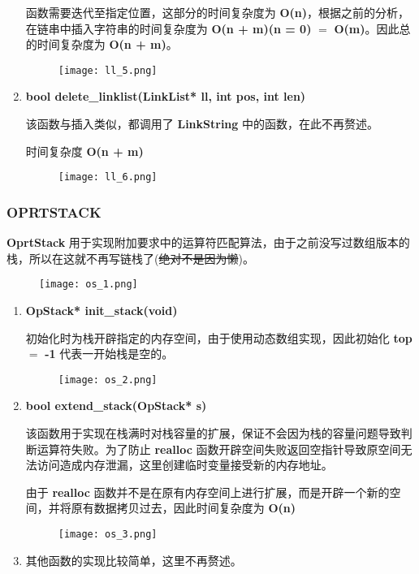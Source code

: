 \begin{enumerate}
                    \par 函数需要迭代至指定位置，这部分的时间复杂度为 \textbf{O(n)}，根据之前的分析，在链串中插入字符串的时间复杂度为 \textbf{O(n + m)(n = 0)} $=$ \textbf{O(m)}。因此总的时间复杂度为 \textbf{O(n + m)}。
                    \begin{figure*}[htbp]
                        \texttt{[image: ll\_5.png]}
                    \end{figure*}
                \newpage
                \item \textbf{bool delete\_linklist(LinkList* ll, int pos, int len)}
                    \par 该函数与插入类似，都调用了 \textbf{LinkString} 中的函数，在此不再赘述。
                    \par 时间复杂度 \textbf{O(n + m)}
                    \begin{figure*}[htbp]
                        \texttt{[image: ll\_6.png]}
                    \end{figure*}
            \end{enumerate}
       \subsubsection{OPRTSTACK}
            \par \textbf{OprtStack} 用于实现附加要求中的运算符匹配算法，由于之前没写过数组版本的栈，所以在这就不再写链栈了(\sout{绝对不是因为懒})。
            \begin{figure*}[htbp]
                \texttt{[image: os\_1.png]}
            \end{figure*}
            \begin{enumerate}
                \item \textbf{OpStack* init\_stack(void)}
                    \par 初始化时为栈开辟指定的内存空间，由于使用动态数组实现，因此初始化 \textbf{top} $=$ \textbf{-1} 代表一开始栈是空的。
                    \begin{figure*}[htbp]
                        \texttt{[image: os\_2.png]}
                    \end{figure*}
                \item \textbf{bool extend\_stack(OpStack* s)}
                    \par 该函数用于实现在栈满时对栈容量的扩展，保证不会因为栈的容量问题导致判断运算符失败。为了防止 \textbf{realloc} 函数开辟空间失败返回空指针导致原空间无法访问造成内存泄漏，这里创建临时变量接受新的内存地址。
                    \par 由于 \textbf{realloc} 函数并不是在原有内存空间上进行扩展，而是开辟一个新的空间，并将原有数据拷贝过去，因此时间复杂度为 \textbf{O(n)}
                    \begin{figure*}[htbp]
                        \texttt{[image: os\_3.png]}
                    \end{figure*}
                \newpage
                \item 其他函数的实现比较简单，这里不再赘述。
            \end{enumerate}
